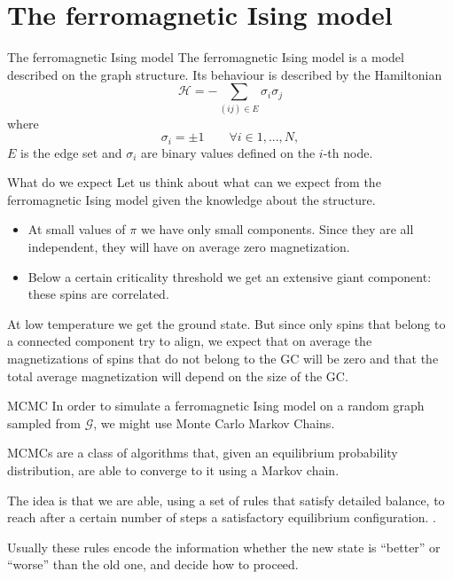 \documentclass[handout]{beamer}
\begin{document}
\section{The ferromagnetic Ising model}

\begin{frame}{The ferromagnetic Ising model}
    The \alert{ferromagnetic Ising model} is a model described on the graph
    structure. Its behaviour is described by the Hamiltonian
    \begin{equation}
        \mathcal{H} = -\sum_{(ij)\in E} \sigma_i \sigma_j
        \label{eq:ferroising_ham}
    \end{equation}
    where
    $$
        \sigma_i = \pm 1 \qquad \forall i \in 1, ..., N,
    $$
    $E$ is the edge set and $\sigma_i$ are binary values defined on the $i$-th
    node.
\end{frame}

\begin{frame}{What do we expect}
    Let us think about what can we expect from the ferromagnetic Ising model
    given the knowledge about the structure.

    \begin{itemize}
        \item At small values of $\pi$ we have only small components. Since
            they are \alert{all independent}, they will have on average zero
            magnetization.
        \item Below a certain criticality threshold we get an extensive giant
            component: these spins are correlated.
    \end{itemize}

    At low temperature we get the ground state. But since only spins that belong
    to a connected component try to align, we expect that on average the
    magnetizations of spins that do not belong to the GC will be zero and that
    the total average magnetization will depend on the size of the GC.
\end{frame}

\begin{frame}{MCMC}
    In order to simulate a ferromagnetic Ising model on a random graph sampled
    from $\mathcal{G}$, we might use \alert{Monte Carlo Markov Chains}.

    MCMCs are a class of algorithms that, given an equilibrium probability
    distribution, are able to converge to it using a Markov chain.

    The idea is that we are able, using a set of rules that satisfy detailed
    balance, to reach after a certain number of steps a satisfactory
    equilibrium configuration. \cite[31-42]{newman_barkema}.

    Usually these rules encode the information whether the new state is
    ``better'' or ``worse'' than the old one, and decide how to proceed.
\end{frame}
\end{document}
